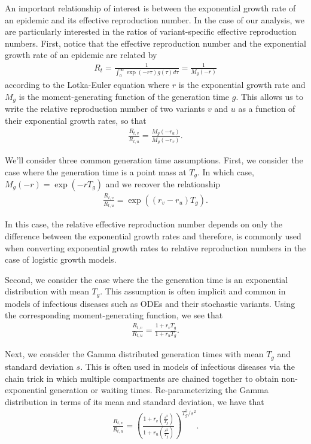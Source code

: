 \documentclass[11pt,oneside,letterpaper]{article}
\begin{document}
An important relationship of interest is between the exponential growth rate of an epidemic and its effective reproduction number. In the case of our analysis, we are particularly interested in the ratios of variant-specific effective reproduction numbers. First, notice that the effective reproduction number and the exponential growth rate of an epidemic are related by
\begin{align*}
R_{t} = \frac{1}{\int_{0}^{\infty} \exp(-r\tau)g(\tau)d\tau} = \frac{1}{M_{g}(-r)}
\end{align*}
according to the Lotka-Euler equation \cite{Wallinga2006} where $r$ is the exponential growth rate and $M_{g}$ is the moment-generating function of the generation time $g$.
This allows us to write the relative reproduction number of two variants $v$ and $u$ as a function of their exponential growth rates, so that
\begin{align*}
\frac{R_{t,v}}{R_{t,u}} = \frac{M_{g}(-r_{u})}{M_{g}(-r_{v})}.
\end{align*}

We'll consider three common generation time assumptions. First, we consider the case where the generation time is a point mass at $T_{g}$. In which case, $M_{g}(-r) = \exp(-r T_{g})$ and we recover the relationship
\begin{align*}
\frac{R_{t,v}}{R_{t,u}} = \exp( (r_{v}-r_{u})T_{g}).
\end{align*}

In this case, the relative effective reproduction number depends on only the difference between the exponential growth rates and therefore, is commonly used when converting exponential growth rates to relative reproduction numbers in the case of logistic growth models.

Second, we consider the case where the the generation time is an exponential distribution with mean $T_{g}$. This assumption is often implicit and common in models of infectious diseases such as ODEs and their stochastic variants. Using the corresponding moment-generating function, we see that
\begin{align*}
\frac{R_{t,v}}{R_{t,u}} = \frac{1 + r_{v} T_{g}}{1 + r_{u} T_{g}}.
\end{align*}


Next, we consider the Gamma distributed generation times with mean $T_{g}$ and standard deviation $s$. This is often used in models of infectious diseases via the chain trick in which multiple compartments are chained together to obtain non-exponential generation or waiting times. Re-parameterizing the Gamma distribution in terms of its mean and standard deviation, we have that
\begin{align*}
\frac{R_{t,v}}{R_{t,u}} = \left( \frac{1 + r_{v}  \left(\frac{s^{2}}{T_{g}}\right)}{1 + r_{u} \left(\frac{s^{2}}{T_{g}}\right) } \right)^{T_{g}^{2} / s^{2}}.
\end{align*}
\end{document}
